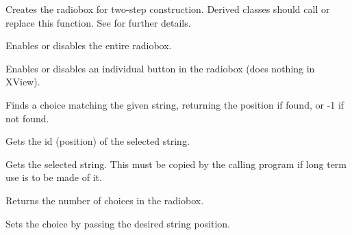 
Creates the radiobox for two-step construction. Derived classes
should call or replace this function. See 
for further details.



Enables or disables the entire radiobox.


Enables or disables an individual button in the radiobox (does nothing
in XView).



Finds a choice matching the given string, returning the position if found, or
-1 if not found.



Gets the id (position) of the selected string.



Gets the selected string. This must be copied by the calling program
if long term use is to be made of it.



Returns the number of choices in the radiobox.



Sets the choice by passing the desired string position.



